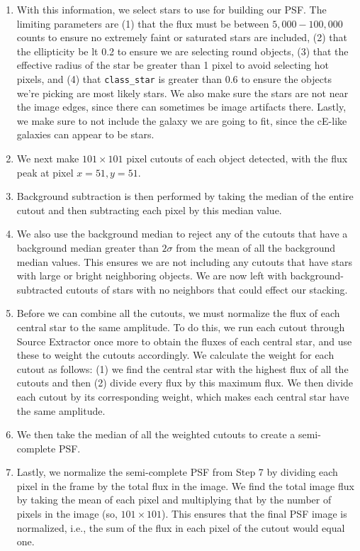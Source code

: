 \documentclass[iop,apj,twocolappendix]{emulateapj}
\begin{document}
\begin{description}
{\begin{enumerate}
\item With this information, we select stars to use for building our PSF. The limiting parameters are (1) that the flux must be between $5,000-100,000$ counts to ensure no extremely faint or saturated stars are included, (2) that the ellipticity be lt 0.2 to ensure we are selecting round objects, (3) that the effective radius of the star be greater than 1 pixel to avoid selecting hot pixels, and (4) that \texttt{class\_star} is greater than 0.6 to ensure the objects we're picking are most likely stars. We also make sure the stars are not near the image edges, since there can sometimes be image artifacts there. Lastly, we make sure to not include the galaxy we are going to fit, since the cE-like galaxies can appear to be stars.

\item We next make $101\times101$ pixel cutouts of each object detected, with the flux peak at pixel $x=51,y=51$. 

\item Background subtraction is then performed by taking the median of the entire cutout and then subtracting each pixel by this median value.

\item We also use the background median to reject any of the cutouts that have a background median greater than $2\sigma$ from the mean of all the background median values. This ensures we are not including any cutouts that have stars with large or bright neighboring objects. We are now left with background-subtracted cutouts of stars with no neighbors that could effect our stacking. 

\item Before we can combine all the cutouts, we must normalize the flux of each central star to the same amplitude. To do this, we run each cutout through Source Extractor once more to obtain the fluxes of each central star, and use these to weight the cutouts accordingly. We calculate the weight for each cutout as follows: (1) we find the central star with the highest flux of all the cutouts and then (2) divide every flux by this maximum flux. We then divide each cutout by its corresponding weight, which makes each central star have the same amplitude.

\item We then take the median of all the weighted cutouts to create a semi-complete PSF.

\item Lastly, we normalize the semi-complete PSF from Step 7 by dividing each pixel in the frame by the total flux in the image. We find the total image flux by taking the mean of each pixel and multiplying that by the number of pixels in the image (so, $101\times101$). This ensures that the final PSF image is normalized, i.e., the sum of the flux in each pixel of the cutout would equal one.    


\end{enumerate}}
\end{description}
\end{document}
